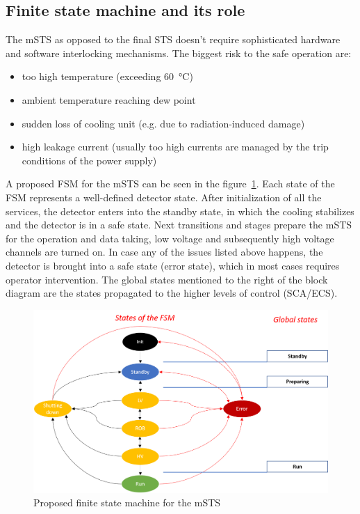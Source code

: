 \subsection{Finite state machine and its role}
The \gls{mSTS} as opposed to the final STS doesn't require sophisticated hardware and software interlocking mechanisms. The biggest risk to the safe operation are:
\begin{itemize}
    \item too high temperature (exceeding \SI{60}{\degreeCelsius})
    \item ambient temperature reaching dew point 
    \item sudden loss of cooling unit (e.g. due to radiation-induced damage)
    \item high leakage current (usually too high currents are managed by the trip conditions of the power supply)
\end{itemize}
A proposed \gls{FSM} for the \gls{mSTS} can be seen in the figure~\ref{fig_FSM}. Each state of the \gls{FSM} represents a well-defined detector state. After initialization of all the services, the detector enters into the standby state, in which the cooling stabilizes and the detector is in a safe state. Next transitions and stages prepare the \gls{mSTS} for the operation and data taking, low voltage and subsequently high voltage channels are turned on. In case any of the issues listed above happens, the detector is brought into a safe state (error state), which in most cases requires operator intervention. The global states mentioned to the right of the block diagram are the states propagated to the higher levels of control (\gls{SCA}/\gls{ECS}).
\begin{figure}[h!]
\centering
\includegraphics[width=0.8\columnwidth]{Chapter3/DCS/images/FSM.png}
\caption{Proposed finite state machine for the \gls{mSTS}}
\label{fig_FSM}
\end{figure}

